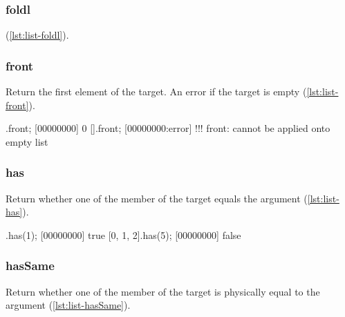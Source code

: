 
\subsubsection{foldl}


(\autoref{lst:list-foldl}).

\begin{urbiscript}[caption=List.foldl, label=lst:list-foldl]

\end{urbiscript}

\subsubsection{front}
\label{sec:std-list-front}

Return the first element of the target. An error if the target is
empty (\autoref{lst:list-front}).

\begin{urbiscript}[caption=List.front, label=lst:list-front]
[0, 1, 2].front;
[00000000] 0
[].front;
[00000000:error] !!! front: cannot be applied onto empty list
\end{urbiscript}

\subsubsection{has}

Return whether one of the member of the target equals the argument
(\autoref{lst:list-has}).

\begin{urbiscript}[caption=List.has, label=lst:list-has]
[0, 1, 2].has(1);
[00000000] true
[0, 1, 2].has(5);
[00000000] false
\end{urbiscript}

\subsubsection{hasSame}

Return whether one of the member of the target is physically equal to
the argument (\autoref{lst:list-hasSame}).

